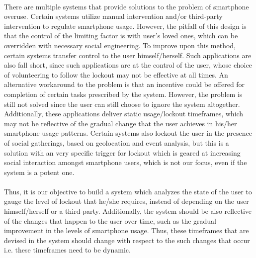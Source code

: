\documentclass{article}
\begin{document}
\paragraph{} There are multiple systems that provide solutions to the problem of smartphone overuse. Certain systems utilize manual intervention and/or third-party intervention to regulate smartphone usage\cite{ko2015nugu, ko2015familync, howells2016putting}. However, the pitfall of this design is that the control of the limiting factor is with user's loved ones, which can be overridden with necessary social engineering. To improve upon this method, certain systems transfer control to the user himself/herself. Such applications\cite{lee2016design, lochtefeld2013appdetox} are also fall short, since such applications are at the control of the user, whose choice of volunteering to follow the lockout may not be effective at all times. An alternative workaround to the problem is that an incentive could be offered for completion of certain tasks prescribed by the system\cite{runyan2013smartphone}. However, the problem is still not solved since the user can still choose to ignore the system altogether. Additionally, these applications deliver static usage/lockout timeframes, which may not be reflective of the gradual change that the user achieves in his/her smartphone usage patterns. Certain systems\cite{ko2016lock} also lockout the user in the presence of social gatherings, based on geolocation and event analysis, but this is a solution with an very specific trigger for lockout which is geared at increasing social interaction amongst smartphone users, which is not our focus, even if the system is a potent one.

\paragraph{} Thus, it is our objective to build a system which analyzes the state of the user to gauge the level of lockout that he/she requires, instead of depending on the user himself/herself or a third-party. Additionally, the system should be also reflective of the changes that happen to the user over time, such as the gradual improvement in the levels of smartphone usage. Thus, these timeframes that are devised in the system should change with respect to the such changes that occur i.e. these timeframes need to be dynamic.
\end{document}
